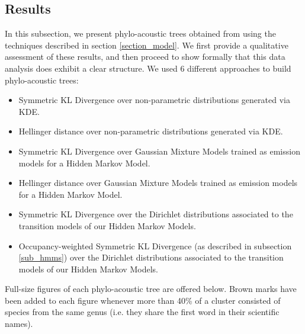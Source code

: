 \documentclass[pdftex,11pt,a4paper]{article}
\theoremstyle{definition}
\theoremstyle{remark}
\begin{document}
\subsection{Results}
\label{section_results}
In this subsection, we present phylo-acoustic trees obtained from using the techniques described in section \ref{section_model}. We first provide a qualitative assessment of these results, and then proceed to show formally that this data analysis does exhibit a clear structure. We used 6 different approaches to build phylo-acoustic trees:
\begin{itemize}
\item Symmetric KL Divergence over non-parametric distributions generated via KDE.
\item Hellinger distance over non-parametric distributions generated via KDE.
\item Symmetric KL Divergence over Gaussian Mixture Models trained as emission models for a Hidden Markov Model.
\item Hellinger distance over Gaussian Mixture Models trained as emission models for a Hidden Markov Model.
\item Symmetric KL Divergence over the Dirichlet distributions associated to the transition models of our Hidden Markov Models.
\item Occupancy-weighted Symmetric KL Divergence (as described in subsection \ref{sub_hmms}) over the Dirichlet distributions associated to the transition models of our Hidden Markov Models.
\end{itemize}
\par Full-size figures of each phylo-acoustic tree are offered below. Brown marks have been added to each figure whenever more than 40\% of a cluster consisted of species from the same genus (i.e. they share the first word in their scientific names). 
\end{document}
